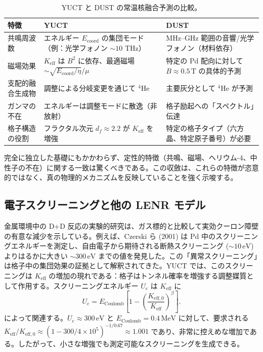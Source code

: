 \documentclass[12pt]{article}
\newcommand{\Keff}{K_{\mathrm{eff}}}
\newcommand{\Keffzero}{K_{\mathrm{eff},0}}
\newcommand{\df}{d_{\!f}}
\theoremstyle{remark}
\begin{document}
	\begin{table}[htbp]
		\centering
		\caption{YUCT と DUST の常温核融合予測の比較。}
		\label{tab:comparison}
		\small
		\begin{tabularx}{\textwidth}{l X X}
			\toprule
			\textbf{特徴} & \textbf{YUCT} & \textbf{DUST} \\
			\midrule
			共鳴周波数 & エネルギー \(E_{\mathrm{coord}}\) の集団モード（例：光学フォノン \(\sim 10\) THz） & MHz–GHz 範囲の音響/光学フォノン（材料依存） \\
			磁場効果 & \(\Keff\) は \(B^2\) に依存、最適磁場 \(\sim \sqrt{E_{\mathrm{coord}}/\eta}/\mu\) & 特定の Pd 配向に対して \(B \approx 0.5\,\text{T}\) の具体的予測 \\
			支配的融合生成物 & 調整による分岐変更を通じて \(^4\)He & 主要灰分として \(^4\)He が予測 \\
			ガンマの不在 & エネルギーは調整モードに散逸（非放射） & 格子励起への「スペクトル」伝達 \\
			格子構造の役割 & フラクタル次元 \(\df \approx 2.2\) が \(\Keff\) を増強 & 特定の格子タイプ（六方晶、特定原子番号）が必要 \\
			\bottomrule
		\end{tabularx}
	\end{table}
	
	完全に独立した基礎にもかかわらず、定性的特徴（共鳴、磁場、ヘリウム-4、中性子の不在）に関する一致は驚くべきである。この収斂は、これらの特徴が恣意的ではなく、真の物理的メカニズムを反映していることを強く示唆する。
	
	\subsection{電子スクリーニングと他の LENR モデル}
	
	金属環境中の D+D 反応の実験的研究は、ガス標的と比較して実効クーロン障壁の有意な減少を示している。例えば、Czerski ら (2001) は Pd 中のスクリーニングエネルギーを測定し、自由電子から期待される断熱スクリーニング (\(\sim 10\,\text{eV}\)) よりはるかに大きい \(\sim 300\,\text{eV}\) までの値を発見した。この「異常スクリーニング」は格子中の集団効果の証拠として解釈されてきた。YUCT では、このスクリーニングは \(\Keff\) の増加の現れである：格子はトンネル確率を増強する調整媒質として作用する。スクリーニングエネルギー \(U_e\) は \(\Keff\) に
	\begin{equation}
		U_e = E_{\text{Coulomb}} \left[1 - \left(\frac{\Keffzero}{\Keff}\right)^{\beta}\right].
	\end{equation}
	によって関連する。\(U_e \approx 300\,\text{eV}\) と \(E_{\text{Coulomb}} = 0.4\,\text{MeV}\) に対して、要求される \(\Keff/\Keffzero \approx (1 - 300/4\times10^5)^{-1/0.67} \approx 1.001\) であり、非常に控えめな増加である。したがって、小さな増強でも測定可能なスクリーニングを生成できる。
	
\end{document}
